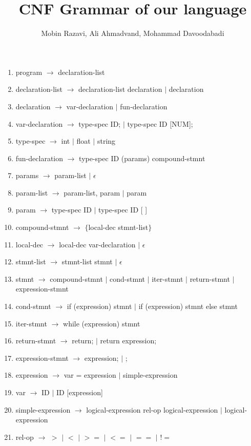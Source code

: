 \documentclass{article}
\begin{document}
\title{CNF Grammar of our language}
\author{Mobin Razavi, Ali Ahmadvand, Mohammad Davoodabadi}
\date{}
\maketitle
\begin{enumerate}
    \item program $\rightarrow$ declaration-list
    \item declaration-list $\rightarrow$ declaration-list   declaration $|$ declaration
    \item declaration $\rightarrow$ var-declaration $|$ fun-declaration
    \item var-declaration $\rightarrow$ type-spec ID; $|$ type-spec ID [NUM];
    \item type-spec $\rightarrow$ int $|$ float $|$ string
    \item fun-declaration $\rightarrow$ type-spec ID (params) compound-stmnt
    \item params $\rightarrow$ param-list $|$ $\epsilon$ 
    \item param-list $\rightarrow$ param-list, param $|$ param
    \item param $\rightarrow$ type-spec ID $|$ type-spec ID [ ]
    \item compound-stmnt $\rightarrow$ $\{$local-dec stmnt-list$\}$
    \item local-dec $\rightarrow$ local-dec var-declaration $|$ $\epsilon$
    \item stmnt-list $\rightarrow$ stmnt-list stmnt $|$ $\epsilon$
    \item stmnt $\rightarrow$ compound-stmnt $|$ cond-stmnt $|$ iter-stmnt $|$ return-stmnt $|$ expression-stmnt
    \item cond-stmnt $\rightarrow$ if (expression) stmnt  $|$ if (expression) stmnt else stmnt
    \item iter-stmnt $\rightarrow$ while (expression) stmnt
    \item return-stmnt $\rightarrow$ return; $|$ return expression;
    \item expression-stmnt $\rightarrow$ expression; $|$ ;
    \item expression $\rightarrow$ var = expression $|$ simple-expression
    \item var $\rightarrow$ ID $|$ ID [expression]
    \item simple-expression $\rightarrow$ logical-expression rel-op logical-expression $|$ logical-expression
    \item rel-op $\rightarrow$ $>$ $|$ $<$ $|$ $>=$ $|$ $<=$ $|$ $==$ $|$ $!=$

\end{enumerate}
\end{document}
